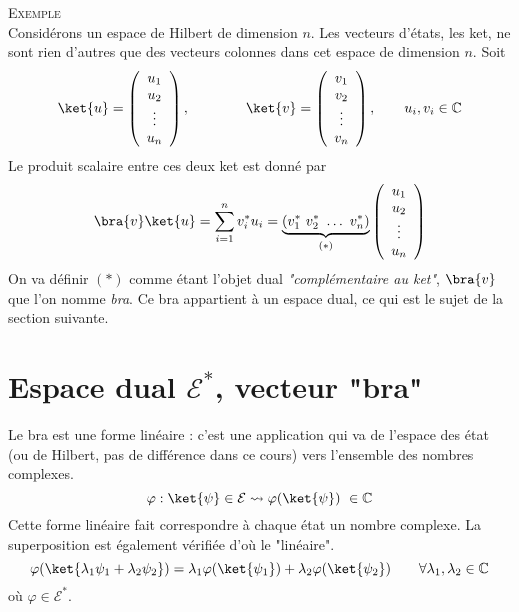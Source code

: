 \textsc{Exemple}\\
Considérons un espace de Hilbert de dimension $n$. Les vecteurs d'états, les ket, ne sont rien 
d'autres que des vecteurs colonnes dans cet espace de dimension $n$. Soit
\begin{equation}
\ket{u} = \left(\begin{array}{c}
u_1\\
u_2\\
\vdots\\
u_n
\end{array}\right),\qquad\qquad \ket{v} = \left(\begin{array}{c}
v_1\\
v_2\\
\vdots\\
v_n
\end{array}\right),\qquad u_i,v_i\in\mathbb{C}
\end{equation}
Le produit scalaire entre ces deux ket est donné par
\begin{equation}
\bra{v}\ket{u} = \sum_{i=1}^n v_i^*u_i = \underbrace{(v_1^*\ v_2^*\ \dots\ v_n^*)}_{(*)}
\left(\begin{array}{c}
u_1\\
u_2\\
\vdots\\
u_n
\end{array}\right)
\end{equation}
On va définir $(*)$ comme étant l'objet dual \textit{"complémentaire au ket"}, $\bra{v}$ que l'on 
nomme \textit{bra}. Ce bra appartient à un espace dual, ce qui est le sujet de la 
section suivante.


\section{Espace dual $\mathcal{E}^*$, vecteur "bra"}
Le bra est une forme linéaire : c'est une application qui va de l'espace des état 
(ou de Hilbert, pas de différence dans ce cours) vers l'ensemble des nombres complexes.
\begin{equation}
\varphi : \ket{\psi}\in\mathcal{E} \leadsto \varphi(\ket{\psi})\ \in \mathbb{C}
\end{equation}
Cette forme linéaire fait correspondre à chaque état un nombre complexe. La superposition 
est également vérifiée d'où le "linéaire".
\begin{equation}
\varphi(\ket{\lambda_1\psi_1 + \lambda_2\psi_2}) = \lambda_1\varphi(\ket{\psi_1})+
\lambda_2\varphi(\ket{\psi_2})\qquad \forall \lambda_1,\lambda_2\in\mathbb{C}
\end{equation}
où $\varphi \in \mathcal{E}^*$.\\

